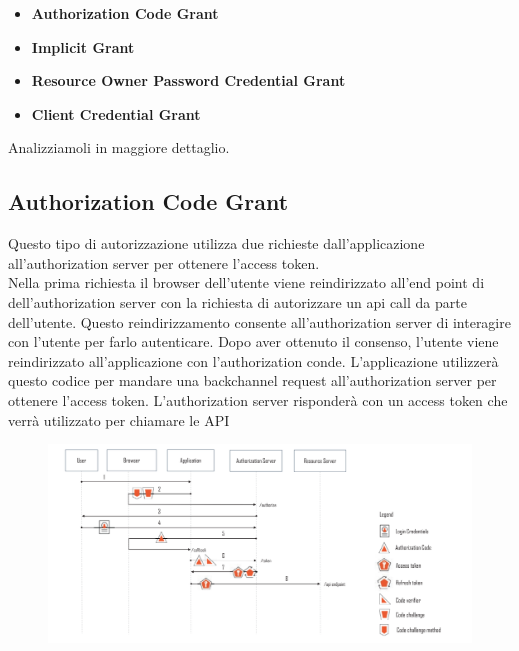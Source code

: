 \begin{itemize}
    \item \textbf{Authorization Code Grant}
    \item \textbf{Implicit Grant}
    \item \textbf{Resource Owner Password Credential Grant}
    \item \textbf{Client Credential Grant}
\end{itemize}

Analizziamoli in maggiore dettaglio.

\subsection{Authorization Code Grant}

Questo tipo di autorizzazione utilizza due richieste dall'applicazione all'authorization
server per ottenere l'access token.\\
Nella prima richiesta il browser dell'utente viene reindirizzato all'end point di
dell'authorization server con la richiesta di autorizzare un api call da parte
dell'utente.
Questo reindirizzamento consente all'authorization server di interagire con l'utente
per farlo autenticare. Dopo aver ottenuto il consenso, l'utente viene reindirizzato
all'applicazione
con l'authorization conde. L'applicazione utilizzerà questo codice per mandare una
backchannel request all'authorization server per ottenere l'access token.
L'authorization server risponderà con un access token che verrà utilizzato per
chiamare le API

\begin{figure}[H]
    \centering
    \includegraphics[width=\textwidth, keepaspectratio]{capitoli/id_managing/imgs/pkce.png}
\end{figure}

